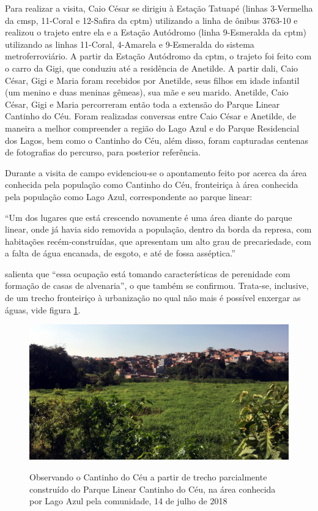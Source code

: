 	Para realizar a visita, Caio César se dirigiu à Estação Tatuapé (linhas 3-Vermelha da \gls{cmsp}, 11-Coral e 12-Safira da \gls{cptm}) utilizando a linha de ônibus 3763-10 e realizou o trajeto entre ela e a Estação Autódromo (linha 9-Esmeralda da \gls{cptm}) utilizando as linhas 11-Coral, 4-Amarela e 9-Esmeralda do sistema metroferroviário. A partir da Estação Autódromo da \gls{cptm}, o trajeto foi feito com o carro da Gigi, que conduziu até a residência de Anetilde. A partir dali, Caio César, Gigi e Maria foram recebidos por Anetilde, seus filhos em idade infantil (um menino e duas meninas gêmeas), sua mãe e seu marido. Anetilde, Caio César, Gigi e Maria percorreram então toda a extensão do Parque Linear Cantinho do Céu. Foram realizadas conversas entre Caio César e Anetilde, de maneira a melhor compreender a região do Lago Azul e do Parque Residencial dos Lagos, bem como o Cantinho do Céu, além disso, foram capturadas centenas de fotografias do percurso, para posterior referência.
	
	Durante a visita de campo evidenciou-se o apontamento feito por  acerca da área conhecida pela população como Cantinho do Céu, fronteiriça à área conhecida pela população como Lago Azul, correspondente ao parque linear:
	
	\begin{citacao}
		``Um dos lugares que está crescendo novamente é uma área diante do parque linear, onde já havia sido removida a população, dentro da borda da represa, com habitações recém-construídas, que apresentam um alto grau de precariedade, com a falta de água encanada, de esgoto, e até de fossa asséptica.''
	\end{citacao}
	
	 salienta que ``essa ocupação está tomando características de perenidade com formação de casas de alvenaria'', o que também se confirmou. Trata-se, inclusive, de um trecho fronteiriço à urbanização no qual não mais é possível enxergar as águas, vide figura \ref{fig:borda_critica}.
	
	\begin{figure}[htb]
		\centering
		\caption[Lago Azul e Cantinho do Céu em 14/07/2018]{Observando o Cantinho do Céu a partir de trecho parcialmente construído do Parque Linear Cantinho do Céu, na área conhecida por Lago Azul pela comunidade, 14 de julho de 2018}
		\includegraphics[width=\linewidth]{img/visita_borda_lago_azul_cantinho}
		\label{fig:borda_critica}
	\end{figure}
	
